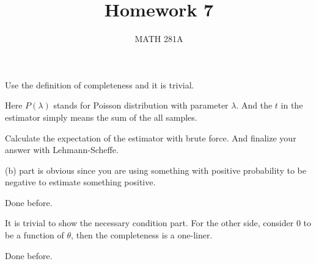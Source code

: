 \documentclass[12pt]{article}
\newenvironment{exercise}[2][Exercise]{\begin{trivlist}
\item[\hskip \labelsep {\bfseries #1}\hskip \labelsep {\bfseries #2.}]}{\end{trivlist}}
\begin{document}
\title{Homework 7}%
\author{MATH 281A} %
\maketitle
\begin{exercise}{1.9.6.32}
\end{exercise}

Use the definition of completeness and it is trivial.

\begin{exercise}{2.7.3.23}
\end{exercise}

Here $P(\lambda)$ stands for Poisson distribution with parameter $\lambda$. And the $t$ in the estimator simply means the sum of the all samples. 

Calculate the expectation of the estimator with brute force. And finalize your answer with Lehmann-Scheffe.

(b) part is obvious since you are using something with positive probability to be negative to estimate something positive.

\begin{exercise}{1.9.7.10/1.9.5.31/1.9.5.32}
\end{exercise}

Done before.

\begin{exercise}{2.7.1.14}
\end{exercise}

It is trivial to show the necessary condition part. For the other side, consider $0$ to be a function of $\theta$, then the completeness is a one-liner. 

\begin{exercise}{2.7.2.25/27}
\end{exercise}

Done before.

\end{document}
